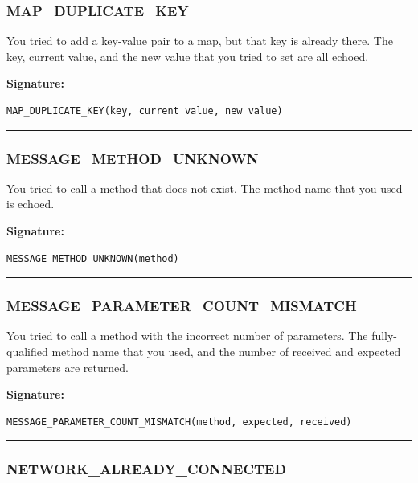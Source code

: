 \subsubsection{MAP\_DUPLICATE\_KEY}

You tried to add a key-value pair to a map, but that key is already there. 
The key, current value, and the new value that you tried to set are all
echoed.

\vspace{0.3cm}
{\bf Signature:}
\begin{verbatim}MAP_DUPLICATE_KEY(key, current value, new value)\end{verbatim}
\begin{center}\rule{10em}{0.1pt}\end{center}

\subsubsection{MESSAGE\_METHOD\_UNKNOWN}

You tried to call a method that does not exist.  The method name that you
used is echoed.

\vspace{0.3cm}
{\bf Signature:}
\begin{verbatim}MESSAGE_METHOD_UNKNOWN(method)\end{verbatim}
\begin{center}\rule{10em}{0.1pt}\end{center}

\subsubsection{MESSAGE\_PARAMETER\_COUNT\_MISMATCH}

You tried to call a method with the incorrect number of parameters.  The
fully-qualified method name that you used, and the number of received and
expected parameters are returned.

\vspace{0.3cm}
{\bf Signature:}
\begin{verbatim}MESSAGE_PARAMETER_COUNT_MISMATCH(method, expected, received)\end{verbatim}
\begin{center}\rule{10em}{0.1pt}\end{center}

\subsubsection{NETWORK\_ALREADY\_CONNECTED}

